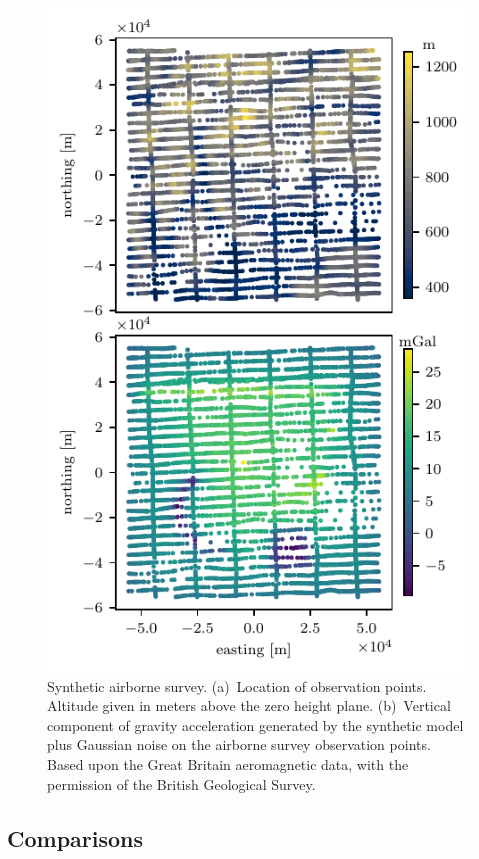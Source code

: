 \documentclass[twocolumn]{article}
\begin{document}
\begin{figure}
    \includegraphics[width=\linewidth]{figs/airborne-survey.pdf}
    \caption{
        Synthetic airborne survey.
        (a)~Location of observation points. Altitude given in meters above the
            zero height plane.
        (b)~Vertical component of gravity acceleration generated by the
            synthetic model plus Gaussian noise on the airborne survey
            observation points.
        Based upon the Great Britain aeromagnetic data, with the permission of
        the British Geological Survey.
    }
    \label{fig:synthetic-airborne-survey}
\end{figure}

\subsection{Comparisons}
\end{document}
